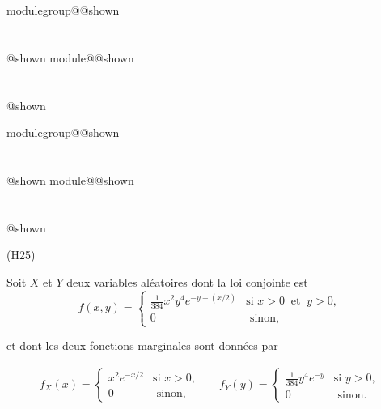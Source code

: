 \documentclass{Evaluation}
\makeatletter
\newcommand{\currentmodulekey}{}
\newcommand{\currentmoduletitle}{}
\newcommand{\currentgroupkey}{}
\newcommand{\currentgrouptitle}{}
\newcommand{\showmoduleifneeded}{%
  \ifx\currentgroupkey\empty\else
    \expandafter\ifx\csname modulegroup@\currentgroupkey @shown\endcsname\relax
      \section*{\currentgrouptitle}%
      \expandafter\gdef\csname modulegroup@\currentgroupkey @shown\endcsname{1}%
    \fi
  \fi
  \expandafter\ifx\csname module@\currentmodulekey @shown\endcsname\relax
    \section*{\currentmoduletitle}%
    \expandafter\gdef\csname module@\currentmodulekey @shown\endcsname{1}%
  \fi
}
\newenvironment{H23}{\showmoduleifneeded}{}
\newenvironment{H25}{\showmoduleifneeded}{}
\makeatother
\begin{document}
\begin{questions}
\begin{H23}
\begin{parts}
\vspace{18cm}

}
}
\part[6] Si $\alpha =8$, calculez $P(1\leq X\leq 6)$.

\begin{solution}
\begin{align*}
    P(0\leq X\leq 1) =& \int_{0}^1 f_X(x)dx\\
    =& \int_{0}^1 \frac{1}{2}\exp(-\frac{x}{2})dx\\
    =& \left. -\exp(-\frac{x}{2})\right|_0^1\\
    =& 1-\exp(-1/2)\\
    \approx& 0,3935
    \end{align*}
\end{solution}

\end{parts}
\end{H23}

\begin{H25}
\question
(H25)

Soit $X$ et $Y$ deux variables aléatoires dont la loi conjointe est 
$$f(x,y)=\left\{
			\begin{array}{ll}
   \displaystyle \frac{1}{384}x^2y^4e^{-y-(x/2)}  & \mbox{si } x> 0\ \mbox{ et } \ y>0, \\
    \displaystyle 0  & \mbox{ sinon, }
			\end{array}
			\right.$$

et dont les deux fonctions marginales sont données par 

\begin{align*}
    f_X(x)=\left\{\begin{array}{ll}
   \displaystyle x^2e^{-x/2}  & \mbox{si } x> 0, \\
    \displaystyle 0  & \mbox{ sinon, }
			\end{array}
			\right. & & f_Y(y)=\left\{\begin{array}{ll}
   \displaystyle \frac{1}{384} y^4e^{-y}  & \mbox{si } y>0, \\
    \displaystyle 0  & \mbox{ sinon.}
			\end{array}
			\right. 
\end{align*}

\end{H25}
\end{questions}
\end{document}
